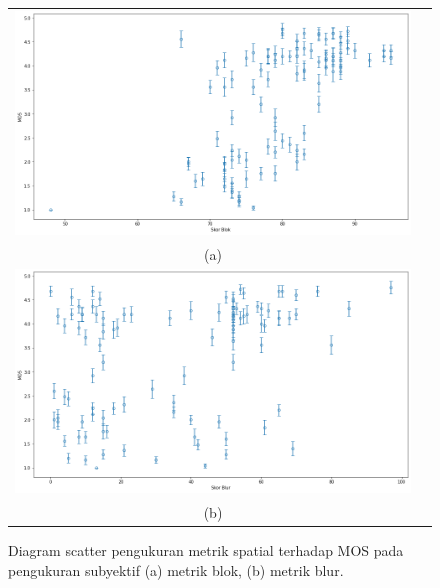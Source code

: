\begin{figure}[H]
\vspace{-0.2cm}
\begin{center}
	\begin{tabular}{cc}
		\includegraphics[width=1\columnwidth]{bab4/Gambar/mos-blok.png} \\
		(a) \\
		\includegraphics[width=1\linewidth]{bab4/Gambar/mos-blur.png} \\
		(b) \\  
	\end{tabular}
\end{center}
	\vspace{-0.1cm}
	\caption{Diagram scatter pengukuran metrik spatial terhadap MOS pada pengukuran subyektif (a) metrik blok, (b) metrik blur.}
	\label{metrik-spatial}
\end{figure}

